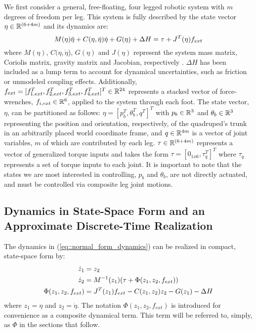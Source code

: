 
We first consider a general, free-floating, four legged robotic system with $m$ degrees of freedom per leg. This system is fully described by the state vector $\eta \in \mathbb{R}^{(6+4m)}$ and its dynamics are:
	\begin{equation}
		\vspace{-1.0mm}
		M(\eta)\ddot{\eta} + C(\eta,\dot{\eta})\dot{\eta} + G(\eta) + \Delta{H} = \tau + J^T(\eta) f_{ext} %
		\label{eq::normal_form_dynamics}
	\end{equation}
where $M(\eta)$, $C(\eta,\dot{\eta}$), $G(\eta)$ and $J(\eta)$ represent the system mass matrix, 
Coriolis matrix, gravity matrix and Jacobian, respectively \cite{Wieber2006}. $\Delta{H}$ 
has been included as a lump term to account for dynamical uncertainties, such as friction or 
unmodeled coupling effects. Additionally, $f_{ext} = [ f_{1,ext}^{T},f_{2,ext}^{T},f_{3,ext}^{T},f_{4,ext}^{T}]^{T} \in \mathbb{R}^{24}$ 
represents a stacked vector of force-wrenches, $f_{i,ext} \in \mathbb{R}^{6}$, applied to the system through each \Ith foot.
The state vector, $\eta$, can be partitioned as follows: 
$\eta = [ p_{b}^{T}, \theta_{b}^{T}, q^{T} ]^{T}$ with $p_{b} \in \mathbb{R}^{3}$ and $\theta_{b} \in \mathbb{R}^{3}$ 
representing the position and orientation, respectively, of the quadruped's trunk in an arbitrarily placed 
world coordinate frame, and $q \in \mathbb{R}^{4 m}$ is a vector of joint variables, $m$ of which are contributed by 
each leg.
$\tau \in \mathbb{R}^{(6+4m)}$ represents a vector of generalized torque inputs and takes the form 
$\tau = [ 0_{1x6}, \tau_{q}^{T} ]^{T}$ where $\tau_{q}$ represents a set of torque inputs to each joint. 
It is important to note that the states we are most interested in controlling, $p_{b}$ and 
$\theta_{b}$, are not directly actuated, and must be controlled via composite leg joint motions.


\subsection{Dynamics in State-Space Form and an Approximate Discrete-Time Realization}
%
%
The dynamics in (\ref{eq::normal_form_dynamics}) can be realized in compact, state-space form by:
	\begin{equation}
		\vspace{-1.0mm}
		\begin{split}
		\dot{z}_{1} 				&= z_{2} \\
		\dot{z}_{2} 				&= M^{-1}(z_{1})(\tau + \Phi(z_{1},z_{2},f_{ext})) \\
		\Phi(z_{1},z_{2},f_{ext}) 	&= J^T(z_{1}) f_{ext} - C(z_{1},z_{2})z_{2} - G(z_{1}) - \Delta{H}
		\end{split}
		\label{eq::state_space_dynamics}
	\end{equation}
where $z_{1}=\eta$ and $z_{2}=\dot{\eta}$. The notation $\Phi(z_{1},z_{2},f_{ext})$ is introduced
for convenience as a composite dynamical term. This term will be referred to, simply, as $\Phi$ in the sections that 
follow.

